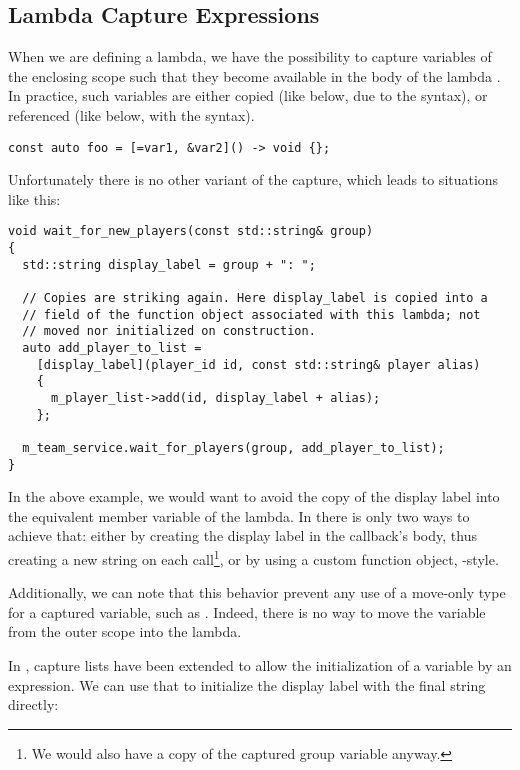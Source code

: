 \subsection{Lambda Capture Expressions}

When we are defining a lambda, we have the possibility to capture
variables of the enclosing scope such that they become available in
the body of the lambda . In practice, such
variables are either copied (like  below, due to the
\code{=} syntax), or referenced (like  below, with the
\code{\&} syntax).

\begin{lstlisting}
const auto foo = [=var1, &var2]() -> void {};
\end{lstlisting}

Unfortunately there is no other variant of the capture, which leads to
situations like this:

\begin{lstlisting}
void wait_for_new_players(const std::string& group)
{
  std::string display_label = group + ": ";

  // Copies are striking again. Here display_label is copied into a
  // field of the function object associated with this lambda; not
  // moved nor initialized on construction.
  auto add_player_to_list =
    [display_label](player_id id, const std::string& player alias)
    {
      m_player_list->add(id, display_label + alias);
    };

  m_team_service.wait_for_players(group, add_player_to_list);
}
\end{lstlisting}

In the above example, we would want to avoid the copy of the display
label into the equivalent member variable of the lambda. In 
there is only two ways to achieve that: either by creating the display
label in the callback's body, thus creating a new string on each
call\footnote{We would also have a copy of the captured group variable
anyway.}, or by using a custom function object, -style.

Additionally, we can note that this behavior prevent any use of a
move-only type for a captured variable, such as
. Indeed, there is no way to move the variable
from the outer scope into the lambda.

\bigskip

In , capture lists have been extended to allow the initialization
of a variable by an expression. We can use that to initialize the
display label with the final string directly:

